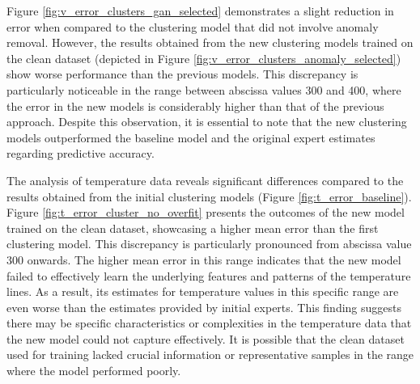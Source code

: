 Figure \ref{fig:v_error_clusters_gan_selected} demonstrates a slight reduction in error when compared to the clustering model that did not involve anomaly removal. However, the results obtained from the new clustering models trained on the clean dataset (depicted in Figure \ref{fig:v_error_clusters_anomaly_selected}) show worse performance than the previous models. This discrepancy is particularly noticeable in the range between abscissa values 300 and 400, where the error in the new models is considerably higher than that of the previous approach. Despite this observation, it is essential to note that the new clustering models outperformed the baseline model and the original expert estimates regarding predictive accuracy.

The analysis of temperature data reveals significant differences compared to the results obtained from the initial clustering models (Figure \ref{fig:t_error_baseline}). Figure \ref{fig:t_error_cluster_no_overfit} presents the outcomes of the new model trained on the clean dataset, showcasing a higher mean error than the first clustering model. This discrepancy is particularly pronounced from abscissa value 300 onwards. The higher mean error in this range indicates that the new model failed to effectively learn the underlying features and patterns of the temperature lines. As a result, its estimates for temperature values in this specific range are even worse than the estimates provided by initial experts. This finding suggests there may be specific characteristics or complexities in the temperature data that the new model could not capture effectively. It is possible that the clean dataset used for training lacked crucial information or representative samples in the range where the model performed poorly.

